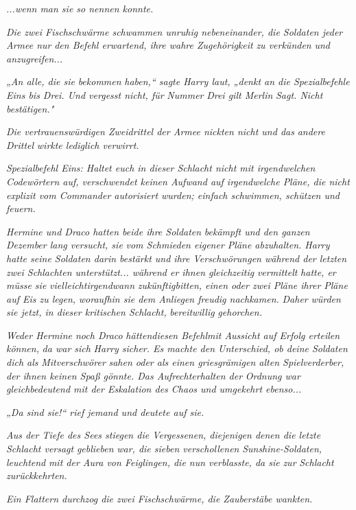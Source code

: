 {\emph{...wenn man sie so nennen konnte.}

\emph{Die zwei Fischschwärme schwammen unruhig nebeneinander, die Soldaten jeder Armee nur} \emph{den Befehl erwartend, ihre wahre Zugehörigkeit} \emph{zu verkünden} \emph{und anzugreifen...}

\emph{„An alle, die sie} \emph{bekommen} \emph{haben,“ sagte Harry laut, „denkt an die Spezialbefehle Eins bis Drei. Und vergesst nicht, für} \emph{Nummer} \emph{Drei gilt Merlin} \emph{Sagt. Nicht bestätigen."}

\emph{Die vertrauenswürdigen Zweidrittel der Armee nickten nicht und das} \emph{andere Drittel} \emph{wirkte lediglich verwirrt.}

\emph{\emph{Spezialbefehl Eins: Haltet euch in dieser Schlacht nicht mit irgendwelchen Codewörtern auf, verschwendet keinen Aufwand auf irgendwelche Pläne, die nicht explizit vom Commander autorisiert wurden; einfach schwimmen, schützen und feuern.}}

\emph{Hermine und Draco hatten beide ihre Soldaten} \emph{bekämpft und den ganzen Dezember lang versucht, sie} \emph{vom Schmieden eigener Pläne abzuhalten. Harry hatte seine Soldaten darin bestärkt und ihre Verschwörungen während der letzten zwei Schlachten unterstützt... während er ihnen gleichzeitig} \emph{vermittelt} \emph{hatte, er müsse sie} \emph{vielleichtirgendwann} \emph{\emph{zukünftig}bitten, einen oder zwei Pläne ihrer Pläne auf Eis zu legen,} \emph{woraufhin sie dem Anliegen freudig nachkamen.} \emph{Daher} \emph{würden sie jetzt, in dieser kritischen Schlacht,} \emph{bereitwillig} \emph{gehorchen.}

\emph{Weder Hermine noch Draco} \emph{hättendiesen Befehlmit Aussicht auf Erfolg erteilen können,} \emph{da war sich} \emph{Harry sicher. Es machte den Unterschied, ob deine Soldaten dich als} \emph{Mitverschwörer} \emph{sahen oder als einen griesgrämigen alten Spielverderber, der ihnen keinen Spaß gönnte. Das Aufrechterhalten der} \emph{Ordnung war gleichbedeutend mit der Eskalation des Chaos und umgekehrt ebenso...}

\emph{„Da sind sie!“ rief jemand und deutete auf sie.}

\emph{Aus der Tiefe des Sees stiegen die Vergessenen, diejenigen denen die letzte Schlacht versagt} \emph{geblieben} \emph{war, die sieben verschollenen} \emph{Sunshine-Soldaten,} \emph{leuchtend} \emph{mit der Aura von Feiglingen, die nun verblasste, da sie} \emph{zur} \emph{Schlacht zurückkehrten.}

\emph{Ein Flattern durchzog die zwei Fischschwärme, die Zauberstäbe wankten.}

}
